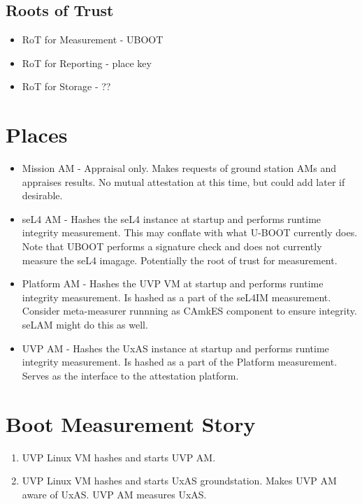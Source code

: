 \documentclass[11pt]{article}
\newcommand{\squash}{\parskip=0pt\itemsep=0pt}
\begin{document}
\subsection{Roots of Trust}

\begin{itemize}
  \parskip=0pt\itemsep=0pt
\item RoT for Measurement - UBOOT
\item RoT for Reporting - place key
\item RoT for Storage - ??
\end{itemize}

\section{Places}

\begin{itemize}
  \squash
\item Mission AM - Appraisal only.  Makes requests of ground station
  AMs and appraises results.  No mutual attestation at this time, but
  could add later if desirable.
\item seL4 AM - Hashes the seL4 instance at startup and performs
  runtime integrity measurement. This may conflate with what U-BOOT
  currently does.  Note that UBOOT performs a signature check and does
  not currently measure the seL4 imagage.  Potentially the root of
  trust for measurement.
\item Platform AM - Hashes the UVP VM at startup and performs runtime
  integrity measurement. Is hashed as a part of the seL4IM
  measurement.  Consider meta-measurer runnning as CAmkES component to
  ensure integrity.  seLAM might do this as well.
\item UVP AM - Hashes the UxAS instance at startup and performs
  runtime integrity measurement.  Is hashed as a part of the Platform
  measurement.  Serves as the interface to the attestation platform.
\end{itemize}

\section{Boot Measurement Story}

\begin{enumerate}
  \squash
\item UVP Linux VM hashes and starts UVP AM.
\item UVP Linux VM hashes and starts UxAS groundstation.  Makes UVP AM
  aware of UxAS. UVP AM measures UxAS. 
\end{enumerate}
\end{document}

